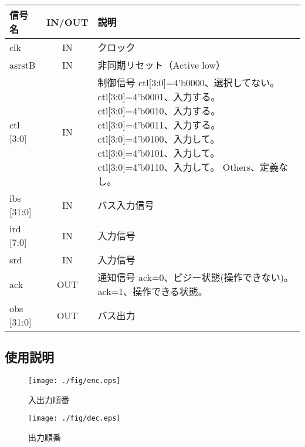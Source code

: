 \documentclass[11pt]{article}
\begin{document}
\begin{table}[!h]
\centering
\vspace{5pt}
\begin{tabular}{|l|c|p{10.2cm}|}
\rowcolor{Gray}
\hline
信号名 & IN/OUT & 説明 \\
\hline
clk & IN & クロック \\
\hline
asrstB & IN & 非同期リセット（Active low）\\
\hline
ctl [3:0] & IN & 
制御信号 \newline 
ctl[3:0]=4'b0000、選択してない。 \newline
ctl[3:0]=4'b0001、入力する。 \newline
ctl[3:0]=4'b0010、入力する。 \newline
ctl[3:0]=4'b0011、入力する。 \newline
ctl[3:0]=4'b0100、入力して。 \newline
ctl[3:0]=4'b0101、入力して。 \newline
ctl[3:0]=4'b0110、入力して。\newline
Others、定義なし。\\
\hline
ibs [31:0] & IN &
バス入力信号 \\
\hline
ird [7:0] & IN &
入力信号 \\
\hline
srd & IN &
入力信号 \\
\hline
ack & OUT &
通知信号 \newline
ack=0、ビジー状態(操作できない)。 \newline
ack=1、操作できる状態。 \\
\hline
obs [31:0] & OUT &
バス出力  \\
\hline
\end{tabular}
\end{table}

\subsection{使用説明}
\label{sec:ip}

\begin{figure}[!h]
\centering
\texttt{[image: ./fig/enc.eps]}
\vspace{-13pt}
\caption{入出力順番}
\label{fig:enc}
\end{figure}

\begin{figure}[!h]
\centering
\texttt{[image: ./fig/dec.eps]}
\vspace{-13pt}
\caption{出力順番}
\label{fig:dec}
\end{figure}
\end{document}
